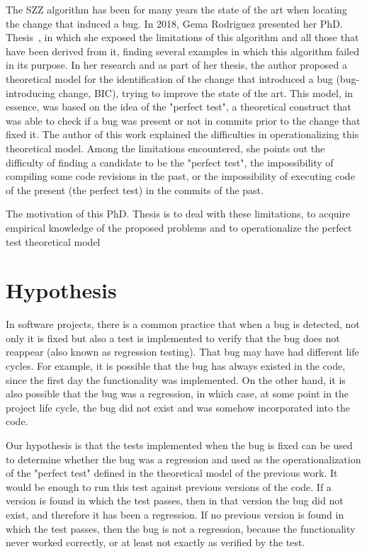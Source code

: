The SZZ algorithm has been for many years the state of the art when locating the change that induced a bug. 
In 2018, Gema Rodriguez presented her PhD. Thesis~\cite{rodriguez2018towards}, in which she exposed the limitations of this algorithm and all those that have been derived from it, finding several examples in which this algorithm failed in its purpose. 
In her research and as part of her thesis, the author proposed a theoretical model for the identification of the change that introduced a bug (bug-introducing change, BIC), trying to improve the state of the art. 
This model, in essence, was based on the idea of the "perfect test", a theoretical construct that was able to check if a bug was present or not in commits prior to the change that fixed it. The author of this work explained the difficulties in operationalizing this theoretical model. 
Among the limitations encountered, she points out the difficulty of finding a candidate to be the "perfect test", the impossibility of compiling some code revisions in the past, or the impossibility of executing code of the present (the perfect test) in the commits of the past.

The motivation of this PhD. Thesis is to deal with these limitations, to acquire empirical knowledge of the proposed problems and to operationalize the perfect test theoretical model

\section{Hypothesis}

In software projects, there is a common practice that when a bug is detected, not only it is fixed but also a test is implemented to verify that the bug does not reappear (also known as regression testing). 
That bug may have had different life cycles. 
For example, it is possible that the bug has always existed in the code, since the first day the functionality was implemented. 
On the other hand, it is also possible that the bug was a regression, in which case, at some point in the project life cycle, the bug did not exist and was somehow incorporated into the code. 

Our hypothesis is that the tests implemented when the bug is fixed can be used to determine whether the bug was a regression and used as the operationalization of the "perfect test" defined in the theoretical model of the previous work. 
It would be enough to run this test against previous versions of the code. 
If a version is found in which the test passes, then in that version the bug did not exist, and therefore it has been a regression. 
If no previous version is found in which the test passes, then the bug is not a regression, because the functionality never worked correctly, or at least not exactly as verified by the test.

